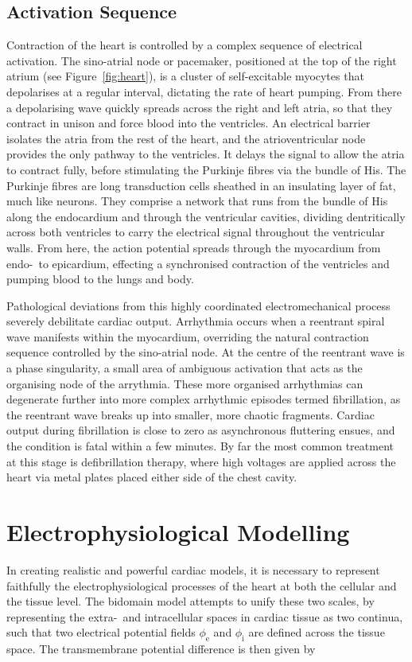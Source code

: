   \subsection{Activation Sequence}
  \label{sub:activation_sequence}
    Contraction of the heart is controlled by a complex sequence of electrical activation. The sino-atrial node or pacemaker, positioned at the top of the right atrium (see Figure~\ref{fig:heart}), is a cluster of self-excitable myocytes that depolarises at a regular interval, dictating the rate of heart pumping. From there a depolarising wave quickly spreads across the right and left atria, so that they contract in unison and force blood into the ventricles. An electrical barrier isolates the atria from the rest of the heart, and the atrioventricular node provides the only pathway to the ventricles. It delays the signal to allow the atria to contract fully, before stimulating the Purkinje fibres via the bundle of His. The Purkinje fibres are long transduction cells sheathed in an insulating layer of fat, much like neurons. They comprise a network that runs from the bundle of His along the endocardium and through the ventricular cavities, dividing dentritically across both ventricles to carry the electrical signal throughout the ventricular walls. From here, the action potential spreads through the myocardium from endo-~to epicardium, effecting a synchronised contraction of the ventricles and pumping blood to the lungs and body.
    
    Pathological deviations from this highly coordinated electromechanical process severely debilitate cardiac output. Arrhythmia occurs when a reentrant spiral wave manifests within the myocardium, overriding the natural contraction sequence controlled by the sino-atrial node. At the centre of the reentrant wave is a phase singularity, a small area of ambiguous activation that acts as the organising node of the arrythmia. These more organised arrhythmias can degenerate further into more complex arrhythmic episodes termed fibrillation, as the reentrant wave breaks up into smaller, more chaotic fragments. Cardiac output during fibrillation is close to zero as asynchronous fluttering ensues, and the condition is fatal within a few minutes. By far the most common treatment at this stage is defibrillation therapy, where high voltages are applied across the heart via metal plates placed either side of the chest cavity.

\section{Electrophysiological Modelling}
\label{sec:electrophysiological_modelling}
  In creating realistic and powerful cardiac models, it is necessary to represent faithfully the electrophysiological processes of the heart at both the cellular and the tissue level. The bidomain model attempts to unify these two scales, by representing the extra-~and intracellular spaces in cardiac tissue as two continua, such that two electrical potential fields $\phi_\text{e}$ and $\phi_\text{i}$ are defined across the tissue space. The transmembrane potential difference is then given by
  
